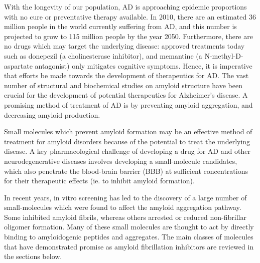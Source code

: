 

With the longevity of our population, AD is approaching epidemic proportions with no cure or preventative therapy available.\cite{Blennow:2006wd} In 2010, there are an estimated 36 million people in the world currently suffering from AD, and this number is projected to grow to 115 million people by the year 2050.\cite{alzreport:2012}  Furthermore, there are no drugs which may target the underlying disease: approved treatments today such as donepezil (a cholinesterase inhibitor), and memantine (a N-methyl-D-aspartate antagonist) only mitigates cognitive symptoms. Hence, it is imperative that efforts be made towards the development of therapeutics for AD.  The vast number of structural and biochemical studies on amyloid structure have been crucial for the development of potential therapeutics for Alzheimer's disease.  A promising method of treatment of AD is by preventing amyloid aggregation, and decreasing amyloid production.

Small molecules which prevent amyloid formation may be an effective method of treatment for amyloid disorders because of the potential to treat the underlying disease. A key pharmacological challenge of developing a drug for AD and other neurodegenerative diseases involves developing a small-molecule candidates, which also penetrate the blood-brain barrier (BBB) at sufficient concentrations for their therapeutic effects (ie. to inhibit amyloid formation).

In recent years, in vitro screening has led to the discovery of a large number of small-molecules which were found to affect the amyloid aggregation pathway. Some inhibited amyloid fibrils, whereas others arrested or reduced non-fibrillar oligomer formation. Many of these small molecules are thought to act by directly binding to amyloidogenic peptides and aggregates. The main classes of molecules that have demonstrated promise as amyloid fibrillation inhibitors are reviewed in the sections below.

